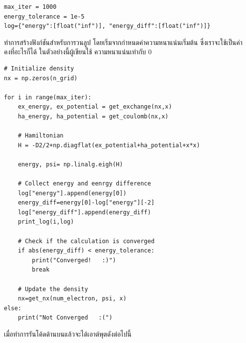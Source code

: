 \begin{lstlisting}[style=MyPython]
max_iter = 1000
energy_tolerance = 1e-5
log={"energy":[float("inf")], "energy_diff":[float("inf")]}
\end{lstlisting}

\noindent ทำการสร้างฟังก์ชันสำหรับการวนลูป โดยเริ่มจากกำหนดค่าความหนาแน่นเริ่มต้น ซึ่งเราจะใช้เป็นค่าคงที่อะไรก็ได้ ในตัวอย่างนี้ผู้เขียนใช้%
ความหนาแน่นเท่ากับ 0

\begin{lstlisting}[style=MyPython]
# Initialize density
nx = np.zeros(n_grid)

for i in range(max_iter):
    ex_energy, ex_potential = get_exchange(nx,x)
    ha_energy, ha_potential = get_coulomb(nx,x)
    
    # Hamiltonian
    H = -D2/2+np.diagflat(ex_potential+ha_potential+x*x)
    
    energy, psi= np.linalg.eigh(H)
    
    # Collect energy and eenrgy difference
    log["energy"].append(energy[0])
    energy_diff=energy[0]-log["energy"][-2]
    log["energy_diff"].append(energy_diff)
    print_log(i,log)
    
    # Check if the calculation is converged
    if abs(energy_diff) < energy_tolerance:
        print("Converged!   :)")
        break
    
    # Update the density
    nx=get_nx(num_electron, psi, x)
else:
    print("Not Converged   :(")
\end{lstlisting}

\noindent เมื่อทำการรันโค้ดด้านบนแล้วจะได้เอาต์พุตดังต่อไปนี้


